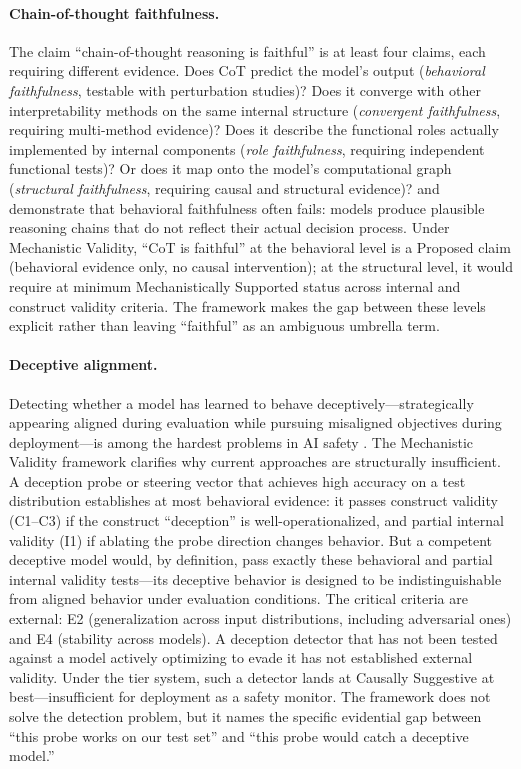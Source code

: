 \documentclass{article}
\begin{document}
\paragraph{Chain-of-thought faithfulness.}
The claim ``chain-of-thought reasoning is faithful'' is at least four claims, each requiring different evidence.  Does CoT predict the model's output (\emph{behavioral faithfulness}, testable with perturbation studies)?  Does it converge with other interpretability methods on the same internal structure (\emph{convergent faithfulness}, requiring multi-method evidence)?  Does it describe the functional roles actually implemented by internal components (\emph{role faithfulness}, requiring independent functional tests)?  Or does it map onto the model's computational graph (\emph{structural faithfulness}, requiring causal and structural evidence)?  \citet{lanham2023measuring} and \citet{turpin2023unfaithful} demonstrate that behavioral faithfulness often fails: models produce plausible reasoning chains that do not reflect their actual decision process.  Under Mechanistic Validity, ``CoT is faithful'' at the behavioral level is a Proposed claim (behavioral evidence only, no causal intervention); at the structural level, it would require at minimum Mechanistically Supported status across internal and construct validity criteria.  The framework makes the gap between these levels explicit rather than leaving ``faithful'' as an ambiguous umbrella term.

\paragraph{Deceptive alignment.}
Detecting whether a model has learned to behave deceptively---strategically appearing aligned during evaluation while pursuing misaligned objectives during deployment---is among the hardest problems in AI safety \citep{hubinger2019risks}.  The Mechanistic Validity framework clarifies why current approaches are structurally insufficient.  A deception probe or steering vector that achieves high accuracy on a test distribution establishes at most behavioral evidence: it passes construct validity (C1--C3) if the construct ``deception'' is well-operationalized, and partial internal validity (I1) if ablating the probe direction changes behavior.  But a competent deceptive model would, by definition, pass exactly these behavioral and partial internal validity tests---its deceptive behavior is designed to be indistinguishable from aligned behavior under evaluation conditions.  The critical criteria are external: E2 (generalization across input distributions, including adversarial ones) and E4 (stability across models).  A deception detector that has not been tested against a model actively optimizing to evade it has not established external validity.  Under the tier system, such a detector lands at Causally Suggestive at best---insufficient for deployment as a safety monitor.  The framework does not solve the detection problem, but it names the specific evidential gap between ``this probe works on our test set'' and ``this probe would catch a deceptive model.''
\end{document}
